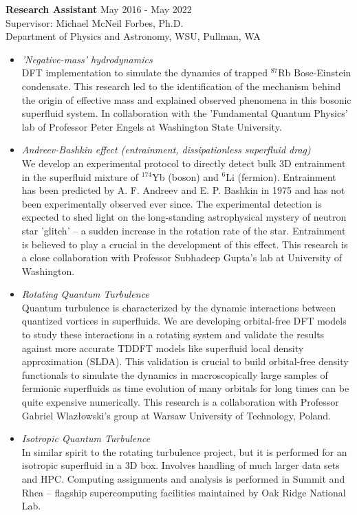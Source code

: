 \documentclass[10pt,fleqn]{scrartcl}
\begin{document}
\noindent
\textbf{Research Assistant}   \hfill May 2016 - May 2022 \\ 
Supervisor: Michael McNeil Forbes, Ph.D. \\
Department of Physics and Astronomy, WSU, Pullman, WA
\begin{itemize}
  \item \textit{'Negative-mass' hydrodynamics}\\
  		DFT implementation to simulate the dynamics of trapped $^{87}$Rb 
        Bose-Einstein condensate. This research led to the identification of 
        the mechanism behind the origin of effective mass and explained 
        observed phenomena in this bosonic superfluid system. In collaboration 
        with the 'Fundamental Quantum Physics' lab of Professor Peter Engels 
        at Washington State University. 
  \item \textit{Andreev-Bashkin effect (entrainment, dissipationless 
    superfluid drag)}\\
  		We develop an experimental protocol to directly detect bulk 3D 
        entrainment in the superfluid mixture of $^{174}$Yb (boson) and 
        $^{6}$Li (fermion). Entrainment has been predicted by A. F. Andreev 
        and E. P. Bashkin in 1975 and has not been experimentally observed ever 
        since. The experimental detection is expected to shed light on the 
        long-standing astrophysical mystery of neutron star 'glitch' -- 
        a sudden increase in the rotation rate of the star. Entrainment is 
        believed to play a crucial in the development of this effect. 
        This research is a close collaboration with Professor Subhadeep 
        Gupta's lab at University of Washington.
  \item \textit{Rotating Quantum Turbulence}\\
  		Quantum turbulence is characterized by the dynamic interactions between 
        quantized vortices in superfluids. We are developing orbital-free DFT 
        models to study these interactions in a rotating system and validate 
        the results against more accurate TDDFT models like superfluid local 
        density approximation (SLDA). This validation is crucial to build 
        orbital-free density functionals to simulate the dynamics in 
        macroscopically large samples of fermionic superfluids as time 
        evolution of many orbitals for long times can be quite expensive 
        numerically. This research is a collaboration with Professor 
        Gabriel Wlazłowski's group at Warsaw University of Technology, Poland.
  	\item \textit{Isotropic Quantum Turbulence}\\
  		In similar spirit to the rotating turbulence project, but it is 
        performed for an 
        isotropic  superfluid in a 3D box. Involves handling of much larger 
        data sets and HPC. Computing assignments and analysis is performed 
        in Summit and Rhea -- flagship supercomputing facilities maintained by 
        Oak Ridge National Lab. 
\end{itemize}
\end{document}
